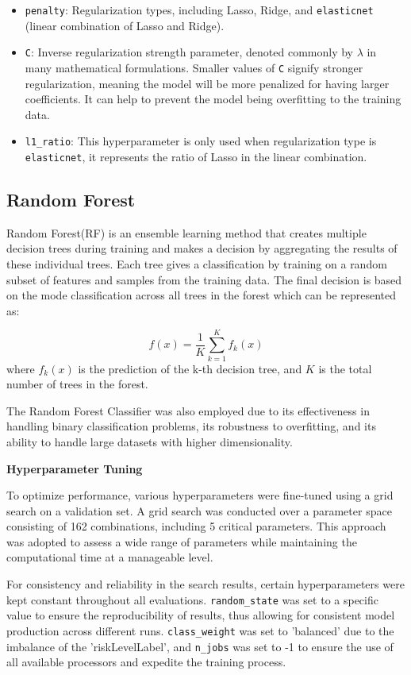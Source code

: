 \documentclass[a4paper,11pt]{report}
\begin{document}
\begin{itemize}
    \item \verb|penalty|: Regularization types, including Lasso, Ridge, and \verb|elasticnet| (linear combination of Lasso and Ridge).
    \item \verb|C|: Inverse regularization strength parameter, denoted commonly by $\lambda$ in many mathematical formulations. Smaller values of \verb|C| signify stronger regularization, meaning the model will be more penalized for having larger coefficients. It can help to prevent the model being overfitting to the training data.
    \item \verb|l1_ratio|: This hyperparameter is only used when regularization type is \verb|elasticnet|, it represents the ratio of Lasso in the linear combination.
\end{itemize}

\subsection{Random Forest}
Random Forest(RF) is an ensemble learning method that creates multiple decision trees during training and makes a decision by aggregating the results of these individual trees. Each tree gives a classification by training on a random subset of features and samples from the training data. The final decision is based on the mode classification across all trees in the forest which can be represented as:

\begin{equation}
f(x) = \frac{1}{K} \sum^K_{k=1} f_k(x)
\end{equation}
where \( f_k(x) \) is the prediction of the k-th decision tree, and \( K \) is the total number of trees in the forest.

The Random Forest Classifier was also employed due to its effectiveness in handling binary classification problems, its robustness to overfitting, and its ability to handle large datasets with higher dimensionality.

\noindent\textbf{Hyperparameter Tuning}

To optimize performance, various hyperparameters were fine-tuned using a grid search on a validation set. A grid search was conducted over a parameter space consisting of 162 combinations, including 5 critical parameters. This approach was adopted to assess a wide range of parameters while maintaining the computational time at a manageable level.

For consistency and reliability in the search results, certain hyperparameters were kept constant throughout all evaluations. \verb|random_state| was set to a specific value to ensure the reproducibility of results, thus allowing for consistent model production across different runs. \verb|class_weight| was set to 'balanced' due to the imbalance of the 'riskLevelLabel', and \verb|n_jobs| was set to -1 to ensure the use of all available processors and expedite the training process.
\end{document}
